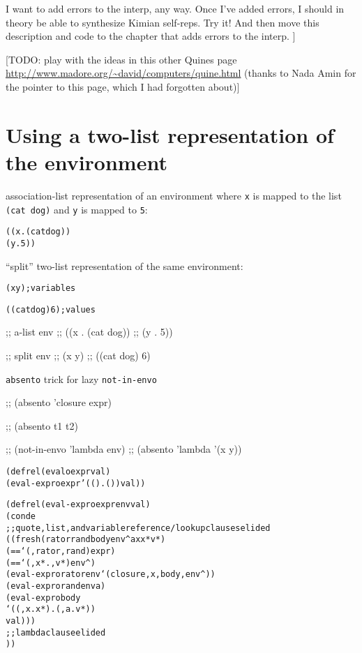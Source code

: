 \documentclass{book}
\begin{document}
I want to add errors to the interp, any way.  Once I've added errors, I should in theory be able to synthesize Kimian self-reps.  Try it!  And then move this description and code to the chapter that adds errors to the interp.
]

[TODO: play with the ideas in this other Quines page \url{http://www.madore.org/~david/computers/quine.html} (thanks to Nada Amin for the pointer to this page, which I had forgotten about)]


\chapter{Using a two-list representation of the environment}%

association-list representation of an environment where \verb|x| is mapped to the list \verb|(cat dog)| and \verb|y| is mapped to \verb|5|:
\begin{alltt}
((x . (cat dog))
 (y . 5))
\end{alltt}
  
``split'' two-list representation of the same environment:
\begin{alltt}
(x y) ; variables

((cat dog) 6) ; values
\end{alltt}

;; a-list env
;; ((x . (cat dog))
;;  (y . 5))

;; split env
;; (x y)
;; ((cat dog) 6)

\verb|absento| trick for lazy \verb|not-in-envo|

;; (absento 'closure expr)

;; (absento t1 t2)

;; (not-in-envo 'lambda env)
;; (absento 'lambda '(x y))

\begin{alltt}
(defrel (evalo expr val)
  (eval-expro expr '(() . ()) val))
\end{alltt}

\begin{alltt}  
(defrel (eval-expro expr env val)
  (conde
    ;; quote, list, and variable reference/lookup clauses elided
    ((fresh (rator rand body env^ a x x* v*)
       (== `(,rator ,rand) expr)
       (== `(,x* . ,v*) env^)
       (eval-expro rator env `(closure ,x ,body ,env^))
       (eval-expro rand env a)
       (eval-expro body
                  `((,x . x*) . (,a . v*))
                  val)))
    ;; lambda clause elided
    ))
\end{alltt}
\end{document}
